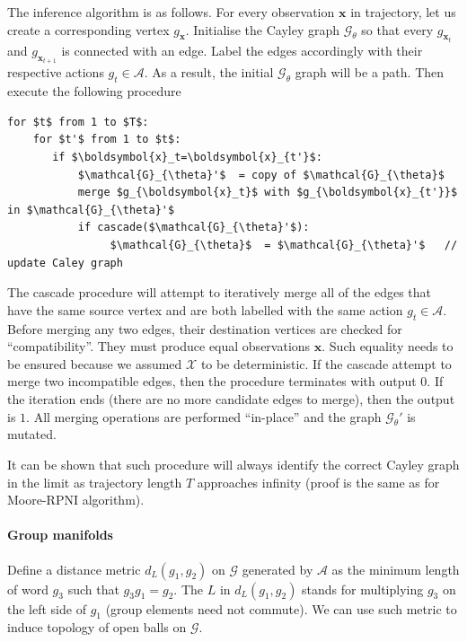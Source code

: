 \documentclass[12pt]{article}
\begin{document}
The inference algorithm is as follows. For every observation $\boldsymbol{x}$ in trajectory, let us create a corresponding vertex $g_{\boldsymbol{x}}$. Initialise the Cayley graph $\mathcal{G}_{\theta}$ so that every $g_{\boldsymbol{x}_t}$ and $g_{\boldsymbol{x}_{t+1}}$ is connected with an edge. Label the edges accordingly with their respective actions $g_{t}\in\mathcal{A}$. As a result, the initial  $\mathcal{G}_{\theta}$ graph will be a path. Then execute the following procedure
\begin{lstlisting}
for $t$ from 1 to $T$:
    for $t'$ from 1 to $t$:
       if $\boldsymbol{x}_t=\boldsymbol{x}_{t'}$:
           $\mathcal{G}_{\theta}'$  = copy of $\mathcal{G}_{\theta}$ 
           merge $g_{\boldsymbol{x}_t}$ with $g_{\boldsymbol{x}_{t'}}$ in $\mathcal{G}_{\theta}'$
           if cascade($\mathcal{G}_{\theta}'$):
                $\mathcal{G}_{\theta}$  = $\mathcal{G}_{\theta}'$   // update Caley graph  
\end{lstlisting}
The cascade procedure will attempt to iteratively merge all of the edges that have the same source vertex and are both labelled with the same action $g_{t}\in\mathcal{A}$. Before merging any two edges, their destination vertices are checked for ``compatibility''. They must produce equal observations $\boldsymbol{x}$. Such equality needs to be ensured because we assumed $\mathcal{X}$ to be deterministic. If the cascade attempt to merge two incompatible edges, then the procedure terminates with output $0$. If the iteration ends (there are no more candidate edges to merge), then the output is $1$. All merging operations are performed ``in-place'' and the graph  $\mathcal{G}_{\theta}'$ is mutated.

It can be shown that such procedure will always identify the correct Cayley graph in the limit as trajectory length $T$ approaches infinity (proof is the same as for Moore-RPNI algorithm).





\paragraph{Group manifolds}


Define a distance metric $d_L(g_1,g_2)$ on $\mathcal{G}$ generated by $\mathcal{A}$ as the minimum length of word $g_3$ such that $g_3g_1=g_2$. The $L$ in $d_L(g_1,g_2)$ stands for multiplying $g_3$ on the left side of $g_1$ (group elements  need not commute). 
We can use such metric to induce topology of open balls on $\mathcal{G}$.
\end{document}
